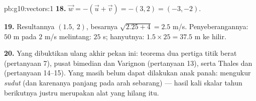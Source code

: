 \begin{solution}{pb:g10:vectors:1}
\textbf{18.} $\vec w = -(\vec u + \vec v) = -(3, 2) =
(-3, -2)$.

\textbf{19.} Resultannya $(1.5,\ 2)$, besarnya
$\sqrt{2.25 + 4} = 2.5$ m/s. Penyeberangannya: $50$ m pada $2$ m/s
melintang: $25$ s; hanyutnya: $1.5 \times 25 = 37.5$ m ke hilir.

\textbf{20.} Yang dibuktikan ulang akhir pekan ini: teorema dua
pertiga titik berat (pertanyaan 7), pusat bimedian dan Varignon
(pertanyaan 13), serta Thales dan  (pertanyaan 14--15). Yang
masih belum dapat dilakukan anak panah: mengukur \emph{sudut} (dan
karenanya panjang pada arah sebarang) --- hasil kali skalar tahun
berikutnya justru merupakan alat yang hilang itu.

\end{solution}
